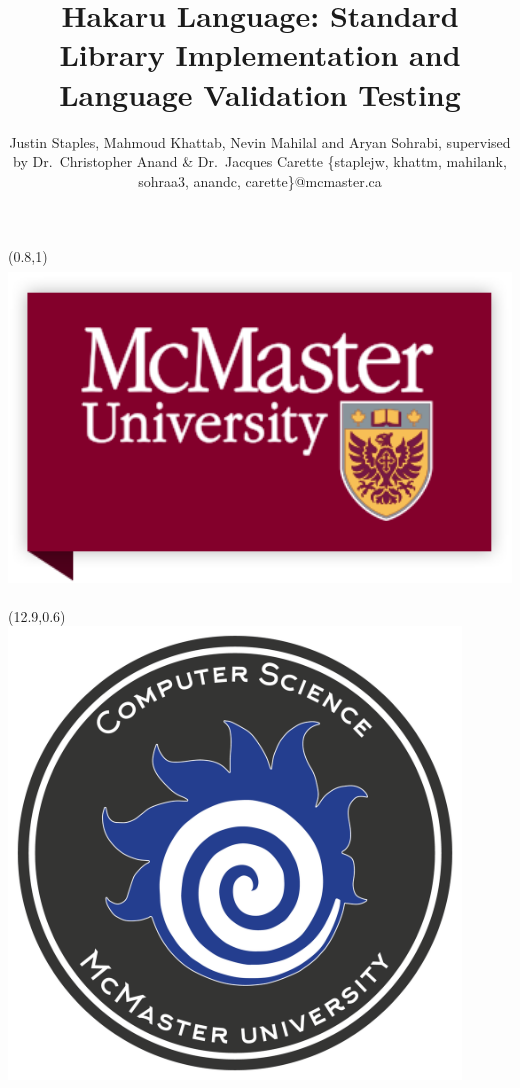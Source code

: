 \documentclass[22pt]{beamer}
\title{Hakaru Language: Standard Library Implementation and Language Validation Testing}
\subtitle{}  %
\author[Justin Staples, Mahmoud Khattab, Nevin Mahilal and Aryan Sohrabi]{Justin Staples, Mahmoud Khattab, Nevin Mahilal and Aryan Sohrabi, supervised by Dr.~Christopher Anand \& Dr.~Jacques Carette \vspace{0.3cm} \newline \small \{staplejw, khattm, mahilank, sohraa3, anandc, carette\}@mcmaster.ca}
\institute[McMaster University]{\small{Department of Computing and Software, McMaster University}}
\date{}
\begin{document}

\begin{frame}[fragile]

\begin{textblock}{2}(0.8,1)
\includegraphics[height=8.5cm]{mac.png}
\end{textblock}

\begin{textblock}{2}(12.9,0.6)
\includegraphics[height=12cm]{fireball.png} 
\end{textblock}


\end{frame}
\end{document}
